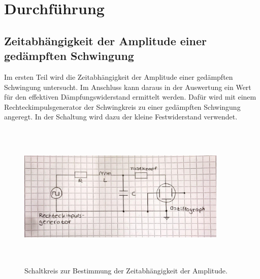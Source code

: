 \section{Durchführung}
\label{sec:Durchfuehrung}

\subsection{Zeitabhängigkeit der Amplitude einer gedämpften Schwingung}
Im ersten Teil wird die Zeitabhängigkeit der Amplitude einer gedämpften Schwingung untersucht. Im Anschluss kann 
daraus in der Auswertung ein Wert für den effektiven Dämpfungswiderstand ermittelt werden. 
Dafür wird mit einem Rechteckimpulsgenerator der Schwingkreis zu einer gedämpften Schwingung angeregt.
In der Schaltung wird dazu der kleine Festwiderstand verwendet.
\begin{figure}
    \centering
    \includegraphics[width= 10cm, height= 7cm]{build/a.jpg}
    \caption{Schaltkreis zur Bestimmung der Zeitabhängigkeit der Amplitude.}
    \label{fig:a}
\end{figure}

